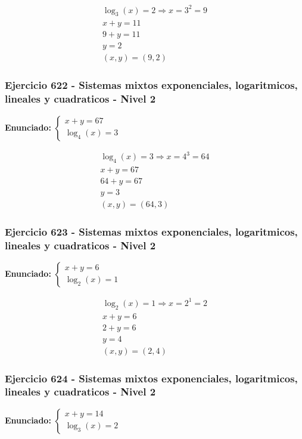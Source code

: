 \documentclass[12pt,a4paper]{article}
\begin{document}
\[
\begin{aligned}
\log_{3}\left(x\right)=2\Rightarrow x=3^{2}=9\\
x+y=11\\
9+y=11\\
y=2\\
\boxed{(x,y)=(9,2)}
\end{aligned}
\]


\subsubsection*{Ejercicio 622 - Sistemas mixtos exponenciales, logaritmicos, lineales y cuadraticos - Nivel 2}
\textbf{Enunciado:} \(\begin{cases} x+y=67\\ \log_{4}\left(x\right)=3\end{cases}\)

\[
\begin{aligned}
\log_{4}\left(x\right)=3\Rightarrow x=4^{3}=64\\
x+y=67\\
64+y=67\\
y=3\\
\boxed{(x,y)=(64,3)}
\end{aligned}
\]


\subsubsection*{Ejercicio 623 - Sistemas mixtos exponenciales, logaritmicos, lineales y cuadraticos - Nivel 2}
\textbf{Enunciado:} \(\begin{cases} x+y=6\\ \log_{2}\left(x\right)=1\end{cases}\)

\[
\begin{aligned}
\log_{2}\left(x\right)=1\Rightarrow x=2^{1}=2\\
x+y=6\\
2+y=6\\
y=4\\
\boxed{(x,y)=(2,4)}
\end{aligned}
\]


\subsubsection*{Ejercicio 624 - Sistemas mixtos exponenciales, logaritmicos, lineales y cuadraticos - Nivel 2}
\textbf{Enunciado:} \(\begin{cases} x+y=14\\ \log_{3}\left(x\right)=2\end{cases}\)
\end{document}

